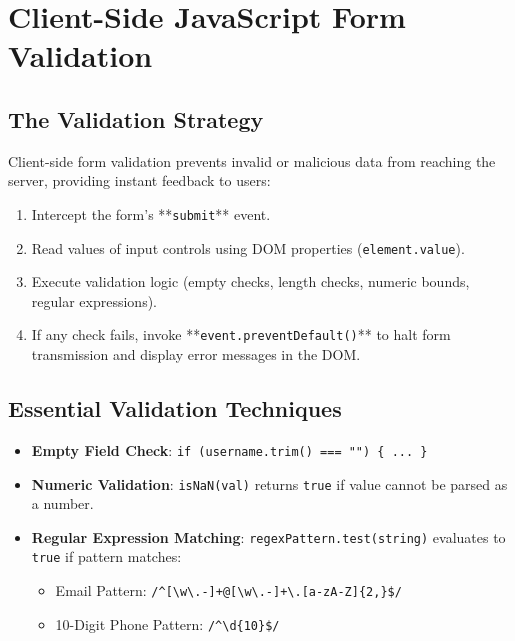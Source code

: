 \section{Client-Side JavaScript Form Validation}

\subsection{The Validation Strategy}
Client-side form validation prevents invalid or malicious data from reaching the server, providing instant feedback to users:
\begin{enumerate}[leftmargin=1.5em]
    \item Intercept the form's **\texttt{submit}** event.
    \item Read values of input controls using DOM properties (\texttt{element.value}).
    \item Execute validation logic (empty checks, length checks, numeric bounds, regular expressions).
    \item If any check fails, invoke **\texttt{event.preventDefault()}** to halt form transmission and display error messages in the DOM.
\end{enumerate}

\subsection{Essential Validation Techniques}
\begin{itemize}[leftmargin=1.5em]
    \item \textbf{Empty Field Check}: \texttt{if (username.trim() === "") \{ ... \}}
    \item \textbf{Numeric Validation}: \texttt{isNaN(val)} returns \texttt{true} if value cannot be parsed as a number.
    \item \textbf{Regular Expression Matching}: \texttt{regexPattern.test(string)} evaluates to \texttt{true} if pattern matches:
    \begin{itemize}
        \item Email Pattern: \texttt{/\textasciicircum[\textbackslash w\textbackslash.-]+@[\textbackslash w\textbackslash.-]+\textbackslash.[a-zA-Z]\{2,\}\$/}
        \item 10-Digit Phone Pattern: \texttt{/\textasciicircum\textbackslash d\{10\}\$/}
    \end{itemize}
\end{itemize}

